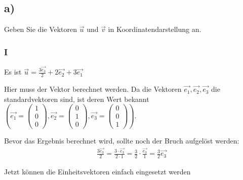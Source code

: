 \subsection{a)}
Geben Sie die Vektoren $\vec{u}$ und $\vec{v}$ in Koordinatendarstellung an.

\subsubsection{I}
Es ist $\vec{u} = \frac{3\vec{e_3}}{2} + 2\vec{e_2} + 3\vec{e_1}$

Hier muss der Vektor berechnet werden. Da die Vektoren $\vec{e_1}, \vec{e_2}, \vec{e_3}$ die standardvektoren sind,
ist deren Wert bekannt $\left(\vec{e_1} = \begin{pmatrix}
    1 \\ 0 \\ 0
\end{pmatrix}, \vec{e_2} = \begin{pmatrix}
    0 \\ 1 \\ 0
\end{pmatrix}, \vec{e_3} = \begin{pmatrix}
    0 \\ 0 \\ 1
\end{pmatrix}\right)$. 

Bevor das Ergebnis berechnet wird, sollte noch der Bruch aufgelöst werden: 
\begin{align*}
    \frac{3\vec{e_3}}{2} = \frac{3 \cdot \vec{e_3}}{2 \cdot 1} = \frac{3}{2} \cdot \frac{\vec{e_3}}{1} = \frac{3}{2}\vec{e_3}
\end{align*}

Jetzt können die Einheitsvektoren einfach eingesetzt werden

